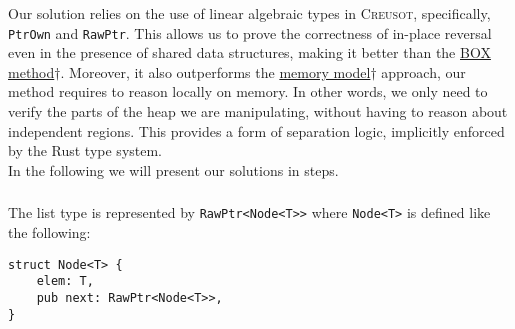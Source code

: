 \documentclass[11pt,a4paper]{article}
\begin{document}
Our solution relies on the use of linear algebraic types in \textsc{Creusot}, specifically, \texttt{PtrOwn} and \texttt{RawPtr}. This allows us to prove the correctness of in-place reversal even in the presence of shared data structures, making it better than the \hyperlink{BOXmeth}{BOX method$\dagger$}. Moreover, it also outperforms the \hyperlink{MEMmodel}{memory model$\dagger$} approach, our method requires to reason locally on memory. In other words, we only need to verify the parts of the heap we are manipulating, without having to reason about independent regions. This provides a form of separation logic, implicitly enforced by the Rust type system.\\
In the following we will present our solutions in steps.\\
\subsubsection{}
The list type is represented by \texttt{RawPtr<Node<T>>} where \texttt{Node<T>} is defined like the following:
\begin{verbatim}
struct Node<T> {
    elem: T,
    pub next: RawPtr<Node<T>>,
}
\end{verbatim}
\end{document}

